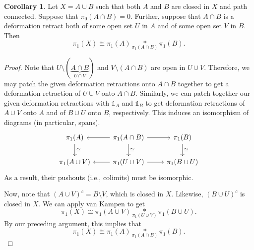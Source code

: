 \documentclass[10pt,letterpaper,cm]{nupset}
\theoremstyle{definition}
\theoremstyle{theorem}
\newtheorem{corollary}[definition]{Corollary}
\theoremstyle{remark}
\newcommand{\1}{\mathbb{1}}
\newcommand{\0}{\vec 0}
\begin{document}
\begin{corollary}
Let $X = A\cup B$ such that both $A$ and $B$ are closed in $X$ and path connected. Suppose that $\pi_0(A\cap B) =0$. Further, suppose that $A \cap B$ is a deformation retract both of some open set $U$ in $A$ and of some open set $V$ in $B$. Then $$\pi_1(X) \cong \pi_1(A) \underset{\pi_1(A\cap B)}{\ast} \pi_1(B).$$
\end{corollary}
\begin{proof}
Note that $U \setminus (\underbrace{A \cap B}_{U \cap V})$ and $V \setminus (A \cap B)$ are open in $U \cup V$. Therefore, we may patch the given deformation retractions onto $A \cap B$ together to get a deformation retraction of $U \cup V$ onto $A \cap B$. Similarly, we can patch together our given deformation retractions with $\1_A$ and $\1_B$ to get deformation retractions of $A\cup V$ onto $A$ and of $B\cup U$ onto $B$, respectively. 
This induces an isomorphism of diagrams (in particular, spans).
\[
\begin{tikzcd}
\pi_1(A) \arrow[d, "\cong"] & \pi_1(A \cap B) \arrow[d, "\cong"]  \arrow[r] \arrow[l] & \pi_1(B) \arrow[d, "\cong"] \\
\pi_1(A \cup V) & \pi_1(U \cup V) \arrow[l] \arrow[r] & \pi_1(B \cup U) 
\end{tikzcd}
\] As a result, their pushouts (i.e., colimits) must be isomorphic. 

\medskip

 Now, note that $(A \cup V)^c = B \setminus V$, which  is closed in $X$. Likewise, $(B \cup U)^c$ is closed in $X$. We can apply van Kampen to get
$$  \pi_1(X) \cong \pi_1(A\cup V) \underset{\pi_1(U \cup V)}{\ast} \pi_1(B \cup U) .$$ By our preceding argument, this implies that $$  \pi_1(X)  \cong \pi_1(A) \underset{\pi_1(A \cap B)}{\ast} \pi_1(B) .$$
\end{proof}
\end{document}
